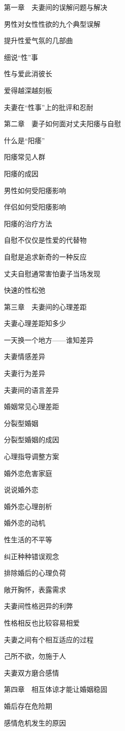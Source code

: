 \documentclass[12pt,UTF8]{ctexbook}
\begin{document}
第一章　夫妻间的误解问题与解决

男性对女性性欲的九个典型误解

提升性爱气氛的几部曲

细说“性”事

性与爱此消彼长

爱得越深越刻板

夫妻在“性事”上的批评和忍耐

第二章　妻子如何面对丈夫阳痿与自慰

什么是“阳痿”

阳痿常见人群

阳痿的成因

男性如何受阳痿影响

伴侣如何受阳痿影响

阳痿的治疗方法

自慰不仅仅是性爱的代替物

自慰是追求新奇的一种反应

丈夫自慰通常害怕妻子当场发现

快速的性松弛

第三章　夫妻间的心理差距

夫妻心理差距知多少

一天换一个地方——谁知差异

夫妻情感差异

夫妻行为差异

夫妻间的语言差异

婚姻常见心理差距

分裂型婚姻

分裂型婚姻的成因

心理指导调整方案

婚外恋危害家庭

说说婚外恋

婚外恋心理剖析

婚外恋的动机

性生活的不平等

纠正种种错误观念

排除婚后的心理负荷

敞开胸怀，表露需求

夫妻间性格迥异的利弊

性格相反也比较容易相爱

夫妻之间有个相互适应的过程

己所不欲，勿施于人

夫妻双方磨合感情

第四章　相互体谅才能让婚姻稳固

婚后存在危险期

感情危机发生的原因
\end{document}
